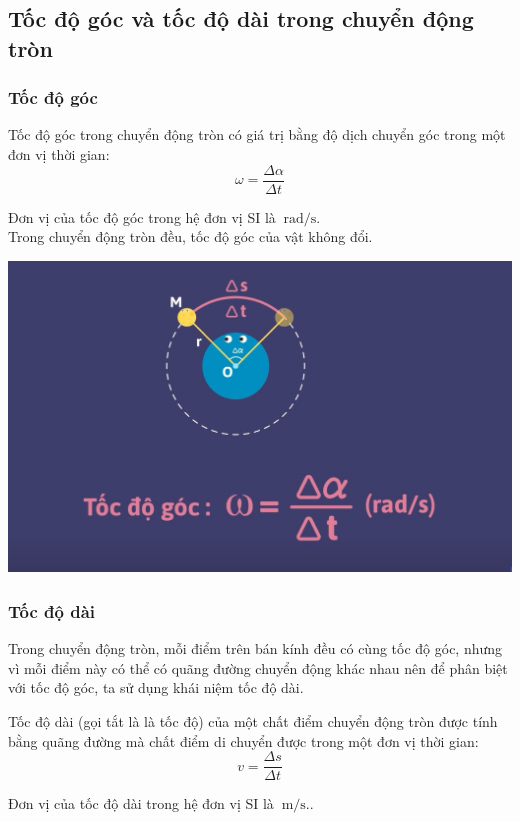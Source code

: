 \subsection{Tốc độ góc và tốc độ dài trong chuyển động tròn}
\subsubsection{Tốc độ góc}
Tốc độ góc trong chuyển động tròn có giá trị bằng độ dịch chuyển góc trong một đơn vị thời gian:
$$\omega = \frac{\Delta \alpha}{\Delta t}$$

Đơn vị của tốc độ góc trong hệ đơn vị SI là $\SI{}{\radian/\second}$.\\

Trong chuyển động tròn đều, tốc độ góc của vật không đổi. 
\begin{center}
	\includegraphics[scale=0.3]{../figs/VN10-PH-06-L-005-2-V2-02.jpg}
\end{center}
\subsubsection{Tốc độ dài}
Trong chuyển động tròn, mỗi điểm trên bán kính đều có cùng tốc độ góc, nhưng vì mỗi điểm này có thể có quãng đường chuyển động khác nhau nên để phân biệt với tốc độ góc, ta sử dụng khái niệm tốc độ dài.

Tốc độ dài (gọi tắt là là tốc độ) của một chất điểm chuyển động tròn được tính bằng quãng đường mà chất điểm di chuyển được trong một đơn vị thời gian:
$$v=\frac{\Delta s}{\Delta t} $$

Đơn vị của tốc độ dài trong hệ đơn vị SI là $\SI{}{\meter/\second.}$.\\

